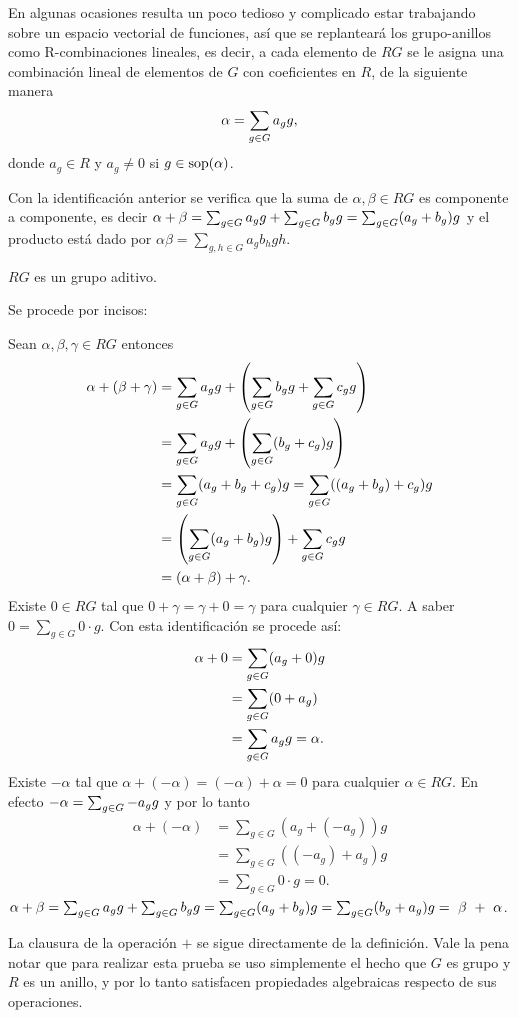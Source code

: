 En algunas ocasiones resulta un poco tedioso y complicado estar trabajando sobre un espacio vectorial de funciones, así que se replanteará los grupo-anillos como R-combinaciones lineales, es decir, a cada elemento de $RG$ se le asigna una combinación lineal de elementos de $G$ con coeficientes en $R$, de la siguiente manera
\begin{equation}
\alpha = \sum_{g \in G} a_{g} g,
\end{equation}
donde $a_g \in R$ y $a_g \neq 0$ si $g \in \operatorname{sop} (\alpha)$.
\begin{nota}
Con la identificación anterior se verifica que la suma de $\alpha, \beta \in RG$ es componente a componente, es decir $\alpha + \beta= \sum_{g \in G} a_{g} g+\sum_{g \in G} b_{g} g= \sum_{g\in G} (a_g+b_g)g $ y el producto está dado por $\alpha\beta=\sum_{g,h\in G}a_gb_hgh$.
\end{nota}
\begin{teorema}\label{grupo}
$RG$ es un grupo aditivo.
\end{teorema}
\begin{proof*}
Se procede por incisos:
\begin{bulletList}
\newItem  Sean $\alpha, \beta, \gamma \in RG$ entonces 
\begin{align*}
\alpha+(\beta+\gamma)&=\sum_{g \in G} a_{g} g+\left(\sum_{g \in G} b_{g} g+ \sum_{g \in G} c_{g} g \right)\\
&=\sum_{g \in G} a_{g} g+\left(\sum_{g\in G}(b_g+c_g)g\right)\\
&=\sum_{g\in G}(a_g+b_g+c_g)g= \sum_{g\in G}((a_g+b_g)+c_g)g\\
&=\left(\sum_{g\in G}(a_g+b_g)g \right) +\sum_{g \in G} c_{g} g\\
&=(\alpha+\beta)+\gamma.  
\end{align*}
\newItem Existe $0 \in RG$ tal que $0+\gamma=\gamma+0=\gamma$ para cualquier $\gamma \in RG$. A saber $0=\sum_{g \in G}0\cdot g$. Con esta identificación se procede así: 
\begin{align*}
\alpha + 0 &= \sum_{g \in G}(a_g+0)g \\
&=\sum_{g\in G}(0+a_g)\\
&=\sum_{g \in G} a_{g} g=\alpha.
\end{align*}
\newItem Existe $-\alpha$ tal que $\alpha+(-\alpha)= (-\alpha)+\alpha =0$ para cualquier $\alpha \in RG$. En efecto $-\alpha = \sum_{g \in G} -a_{g} g$ y por lo tanto
\begin{align*}
\alpha+ (-\alpha)&=\sum_{g\in G}(a_g+(-a_g) )g\\
&= \sum_{g\in G}((-a_g)+a_g)g\\ 
&= \sum_{g \in G}0\cdot g = 0.
\end{align*} 
\newItem $\alpha + \beta = \sum_{g \in G} a_{g} g+\sum_{g \in G} b_{g} g=\sum_{g \in G}(a_g+b_g)g= \sum_{g \in G}(b_g+a_g)g=~\beta ~+~ \alpha $.\qedhere
\end{bulletList}
\end{proof*}
La clausura de la operación $+$  se sigue directamente de la definición. Vale la pena notar que para realizar esta prueba se uso simplemente el hecho que $G$ es grupo y $R$ es un anillo, y por lo tanto satisfacen propiedades algebraicas respecto de sus operaciones.

